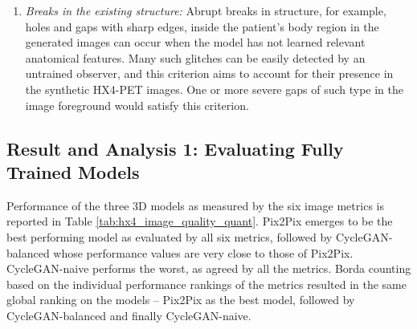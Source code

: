 \begin{enumerate}
    \item \textit{Breaks in the existing structure:} Abrupt breaks in structure, for example, holes and gaps with sharp edges, inside the patient's body region in the generated images can occur when the model has not learned relevant anatomical features. Many such glitches can be easily detected by an untrained observer, and this criterion aims to account for their presence in the synthetic HX4-PET images. One or more severe gaps of such type in the image foreground would satisfy this criterion.
\end{enumerate}



\subsection{Result and Analysis 1: Evaluating Fully Trained Models}
Performance of the three 3D models as measured by the six image metrics is reported in Table \ref{tab:hx4_image_quality_quant}. Pix2Pix emerges to be the best performing model as evaluated by all six metrics, followed by CycleGAN-balanced whose performance values are very close to those of Pix2Pix. CycleGAN-naive performs the worst, as agreed by all the metrics. Borda counting based on the individual performance rankings of the metrics resulted in the same global ranking on the models -- Pix2Pix as the best model, followed by CycleGAN-balanced and finally CycleGAN-naive.


